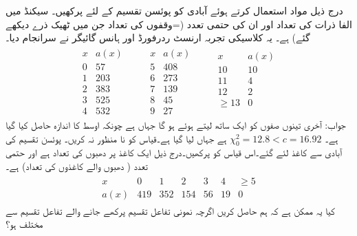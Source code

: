 \quad
درج ذیل مواد استعمال کرتے ہوئے آبادی کو پوئسن تقسیم کے لئے پرکھیں۔ سیکنڈ میں الفا ذرات کی تعداد  اور  ان کی حتمی تعدد (=وقفوں کی تعداد جن میں ٹھیک  ذرے دیکھے گئے) ہے۔ یہ کلاسیکی تجربہ ارنسٹ ردرفورڈ اور ہانس گائیگر نے  سرانجام دیا۔
\begin{align*}
\begin{array}{rr}
x&a(x)\\
\hline
0&57\\
1&203\\
2&383\\
3&525\\
4&532
\end{array}\quad\quad
\begin{array}{rr}
x&a(x)\\
\hline
5&408\\
6&273\\
7&139\\
8&45\\
9&27
\end{array}\quad\quad
\begin{array}{rr}
x&a(x)\\
\hline
10&10\\
11&4\\
12&2\\
\ge 13&0\\
&
\end{array}
\end{align*}
جواب:\quad
آخری تینوں صفوں کو ایک ساتھ لیتے ہوئے  ہو گا جہاں  ہے چونکہ اوسط کا اندازہ حاصل کیا گیا ہے۔
$\chi^2_0=12.8<c=16.92$
ہے جہاں  لیا گیا ہے۔قیاس کو نا منظور نہ کریں۔ 
\quad
پوئسن تقسیم کی  آبادی سے  کاغذ لئے گئے۔اس قیاس کو پرکھیں۔درج ذیل ایک کاغذ پر دھبوں کی تعداد  ہے اور   حتمی تعدد ( دھبوں والے کاغذوں کی تعداد) ہے۔  
\begin{align*}
\begin{array}{ccccccc}
x&0&1&2&3&4&\ge 5\\
a(x)&419&352&154&56&19&0
\end{array}
\end{align*}
\quad
کیا یہ ممکن ہے کہ ہم  حاصل کریں اگرچہ  نمونی تفاعل تقسیم پرکھے جانے والے  تفاعل تقسیم  سے مختلف ہو؟


